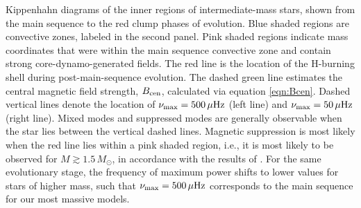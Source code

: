 \label{fig:DipoleHist}
Kippenhahn diagrams of the inner regions of intermediate-mass stars, shown from the main sequence to the red clump phases of evolution. Blue shaded regions are convective zones, labeled in the second panel. Pink shaded regions indicate mass coordinates that were within the main sequence convective zone and contain strong core-dynamo-generated fields. The red line is the location of the H-burning shell during post-main-sequence evolution. The dashed green line estimates the central magnetic field strength, $B_{\rm cen}$, calculated via equation \ref{eqn:Bcen}. Dashed vertical lines denote the location of $\nu_{\rm max} = 500 \, \mu{\rm Hz}$ (left line) and $\nu_{\rm max} = 50 \, \mu{\rm Hz}$ (right line). Mixed modes and suppressed modes are generally observable when the star lies between the vertical dashed lines. Magnetic suppression is most likely when the red line lies within a pink shaded region, i.e., it is most likely to be observed for $M \gtrsim 1.5 \, M_\odot$, in accordance with the results of \cite{Stello_2016}. For the same evolutionary stage, the frequency of maximum power shifts to lower values for stars of higher mass, such that $\nu_{\rm max} = 500 \, \mu{\rm Hz}$ corresponds to the main sequence for our most massive models.